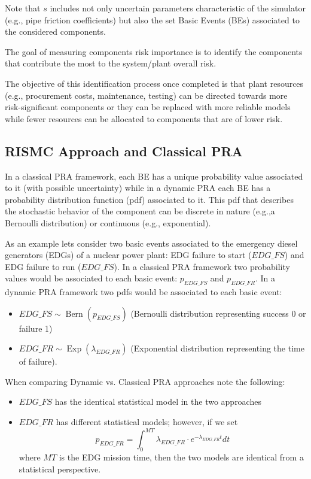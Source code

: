 Note that $s$ includes not only uncertain parameters
characteristic of the simulator (e.g., pipe friction coefficients) but also the set Basic Events (BEs)
associated to the considered components. 

The goal of measuring components risk importance is to identify the components that contribute the most
to the system/plant overall risk.

The objective of this identification process once completed is that plant resources 
(e.g., procurement costs, maintenance, testing)
can be directed towards more risk-significant components or they can be replaced with more 
reliable models while fewer resources can be allocated to components that are of lower risk.


\subsection{RISMC Approach and Classical PRA}
\label{sec:analogy}

In a classical PRA framework, each BE has a unique probability value 
associated to it (with possible uncertainty) while in a dynamic PRA each BE has a probability distribution function (pdf) 
associated to it.
This pdf that describes the stochastic behavior of the component can be discrete in nature (e.g.,a Bernoulli distribution) or continuous (e.g., exponential). 

As an example lets consider two basic events associated to the emergency diesel generators (EDGs) of 
a nuclear power plant: EDG failure to start ($EDG\_FS$) and EDG failure to run ($EDG\_FS$).
In a classical PRA framework two probability values would be associated to each basic event: $p_{EDG\_FS}$ and 
$p_{EDG\_FR}$.
In a dynamic PRA framework two pdfs would be associated to each basic event:
\begin{itemize}
  \item $EDG\_FS \sim \operatorname{Bern}(p_{EDG\_FS})$ (Bernoulli distribution representing success 0 or failure 1)
  \item $EDG\_FR \sim \operatorname{Exp}(\lambda_{EDG\_FR})$ (Exponential distribution representing the time of failure).
\end{itemize}
When comparing Dynamic vs. Classical PRA approaches note the following:
\begin{itemize}
  \item $EDG\_FS$ has the identical statistical model in the two approaches
  \item $EDG\_FR$ has different statistical models; however, if we set 
        \begin{equation}
          p_{EDG\_FR} = \int_0^{MT} \lambda_{EDG\_FR} \cdot e^{-\lambda_{EDG\_FR} t} dt
          \label{fig:contDiscAnalogy}
        \end{equation}
        where $MT$ is the EDG mission time, then the two models are identical from a 
        statistical perspective.
\end{itemize}

